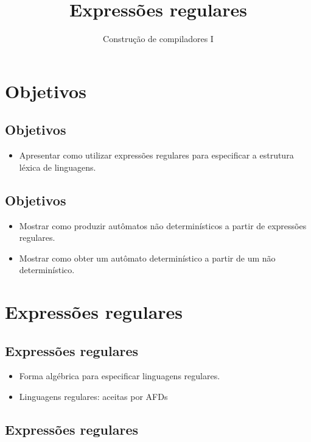 \documentclass[11pt]{article}
\author{Construção de compiladores I}
\date{}
\title{Expressões regulares}
\begin{document}
\maketitle
\section*{Objetivos}
\label{sec:org328c7e8}

\subsection*{Objetivos}
\label{sec:org63cd279}

\begin{itemize}
\item Apresentar como utilizar expressões regulares para
especificar a estrutura léxica de linguagens.
\end{itemize}
\subsection*{Objetivos}
\label{sec:orgf654ed2}

\begin{itemize}
\item Mostrar como produzir autômatos não determinísticos a partir de expressões regulares.

\item Mostrar como obter um autômato determinístico a partir de um não determinístico.
\end{itemize}
\section*{Expressões regulares}
\label{sec:org7c6a125}

\subsection*{Expressões regulares}
\label{sec:org732cf12}

\begin{itemize}
\item Forma algébrica para especificar linguagens regulares.

\item Linguagens regulares: aceitas por AFDs
\end{itemize}
\subsection*{Expressões regulares}
\label{sec:orgcce89b5}
\end{document}

